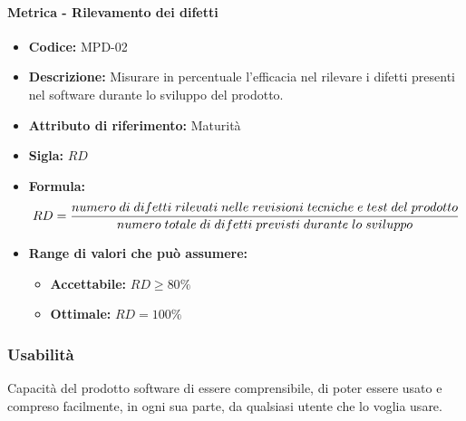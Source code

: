         \paragraph{Metrica - Rilevamento dei difetti} 
                \begin{itemize}
        \item   \textbf{Codice:} MPD-02
        \item   \textbf{Descrizione:} Misurare in percentuale l'efficacia nel rilevare i difetti presenti nel software durante lo sviluppo del prodotto.
    \item    \textbf{Attributo di riferimento:} Maturità
    \item    \textbf{Sigla:} $RD$
    \item    \textbf{Formula:} $$RD = {numero \; di \; difetti \; rilevati \; nelle \; revisioni \; tecniche \; e \; test \; del \; prodotto \over numero \; totale \; di \; difetti \; previsti \; durante \; lo \; sviluppo}$$
             
             \item \textbf{Range di valori che può assumere:}
        \begin{itemize}
            \item \textbf{Accettabile:} $RD \geq 80\% $
            \item \textbf{Ottimale:} $RD = 100\%$
        \end{itemize}
       \end{itemize}
              
      
\subsubsection{Usabilità} 
Capacità del prodotto software di essere comprensibile, di poter essere usato e compreso facilmente, in ogni sua parte, da qualsiasi utente che lo voglia usare. \\

